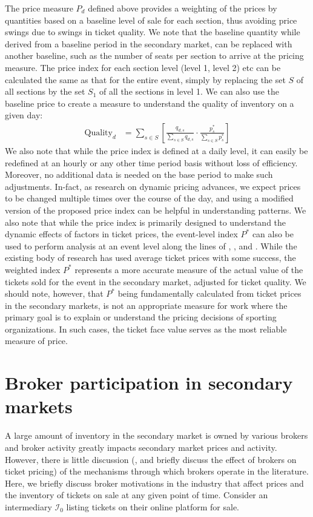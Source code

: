 \documentclass[letterpaper, 12pt]{article}
\begin{document}
The price measure $P_d$ defined above provides a weighting of the prices by quantities based on a baseline level of sale for each section, thus avoiding price swings due to swings in ticket quality. We note that the baseline quantity while derived from a baseline period in the secondary market, can be replaced with another baseline, such as the number of seats per section to arrive at the pricing measure. The price index for each section level (level 1, level 2) etc can be calculated the same as that for the entire event, simply by replacing the set $S$ of all sections by the set $S_1$ of all the sections in level 1. We can also use the baseline price to create a measure to understand the quality of inventory on a given day:
\begin{align*}
  \text{Quality}_d & = \sum_{s\in S} \left[ \frac{q_{d,s}}{\sum_{s\in S}q_{d,s}} \cdot \frac{p^*_s}{\sum_{s\in S}p^*_s}\right]
      \end{align*}
We also note that while the price index is defined at a daily level, it can easily be redefined at an hourly or any other time period basis without loss of efficiency. Moreover, no additional data is needed on the base period to make such adjustments. In-fact, as research on dynamic pricing advances, we expect prices to be changed multiple times over the course of the day, and using a modified version of the proposed price index can be helpful in understanding patterns. We also note that while the price index is primarily designed to understand the dynamic effects of factors in ticket prices, the event-level index $P^*$ can also be used to perform analysis at an event level along the lines of \cite{rishe2003ticket}, \cite{shapiro2012new}, and \cite{kemper2015factors}. While the existing body of research has used average ticket prices with some success, the weighted index $P^*$ represents a more accurate measure of the actual value of the tickets sold for the event in the secondary market, adjusted for ticket quality. We should note, however, that $P^*$ being fundamentally calculated from ticket prices in the secondary markets, is not an appropriate measure for work where the primary goal is to explain or understand the pricing decisions of sporting organizations. In such cases, the ticket face value serves as the most reliable measure of price.

\section{Broker participation in secondary markets}\label{cip}
A large amount of inventory in the secondary market is owned by various brokers and broker activity greatly impacts secondary market prices and activity. However, there is little discussion (\cite{courty2003some}, and \cite{happel2001creating} briefly discuss the effect of brokers on ticket pricing) of the mechanisms through which brokers operate in the literature. Here, we briefly discuss broker motivations in the industry that affect prices and the inventory of tickets on sale at any given point of time. Consider an intermediary $\mathcal{I}_0$ listing tickets on their online platform for sale. 
\end{document}

